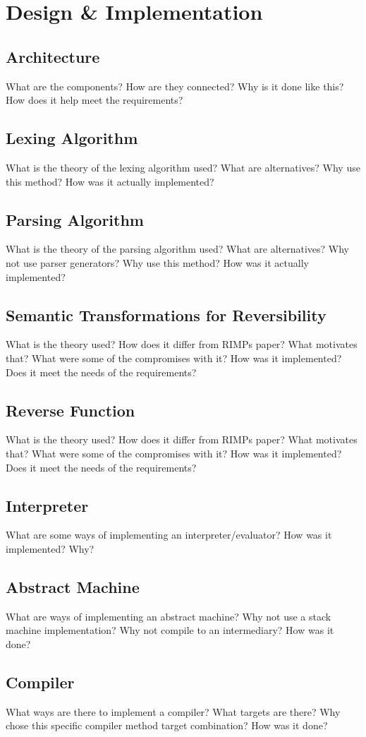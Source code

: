 \chapter{Design \& Implementation}

\section{Architecture}
What are the components?
How are they connected?
Why is it done like this?
How does it help meet the requirements?

\section{Lexing Algorithm}
What is the theory of the lexing algorithm used?
What are alternatives?
Why use this method?
How was it actually implemented?

\section{Parsing Algorithm}
What is the theory of the parsing algorithm used?
What are alternatives?
Why not use parser generators?
Why use this method?
How was it actually implemented?

\section{Semantic Transformations for Reversibility}
What is the theory used?
How does it differ from RIMPs paper?
What motivates that?
What were some of the compromises with it?
How was it implemented?
Does it meet the needs of the requirements?

\section{Reverse Function}
What is the theory used?
How does it differ from RIMPs paper?
What motivates that?
What were some of the compromises with it?
How was it implemented?
Does it meet the needs of the requirements?

\section{Interpreter}
What are some ways of implementing an interpreter/evaluator?
How was it implemented?
Why?

\section{Abstract Machine}
What are ways of implementing an abstract machine?
Why not use a stack machine implementation?
Why not compile to an intermediary?
How was it done?

\section{Compiler}
What ways are there to implement a compiler?
What targets are there?
Why chose this specific compiler method target combination?
How was it done?
